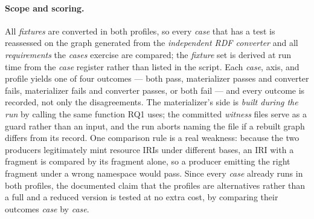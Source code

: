 \paragraph{Scope and scoring.}
All \emph{fixtures} are converted in both profiles, so every \emph{case} that has a test is reassessed on the graph generated from the \emph{independent RDF converter} and all \emph{requirements} the \emph{cases} exercise are compared; the \emph{fixture} set is derived at run time from the \emph{case} register rather than listed in the script.
Each \emph{case}, axis, and profile yields one of four outcomes --- both pass, materializer passes and converter fails, materializer fails and converter passes, or both fail --- and every outcome is recorded, not only the disagreements.
The materializer's side is \emph{built during the run} by calling the same function RQ1 uses; the committed \emph{witness} files serve as a guard rather than an input, and the run aborts naming the file if a rebuilt graph differs from its record.
One comparison rule is a real weakness: because the two producers legitimately mint resource IRIs under different bases, an IRI with a fragment is compared by its fragment alone, so a producer emitting the right fragment under a wrong namespace would pass.
Since every \emph{case} already runs in both profiles, the documented claim that the profiles are alternatives rather than a full and a reduced version is tested at no extra cost, by comparing their outcomes \emph{case} by \emph{case}.

